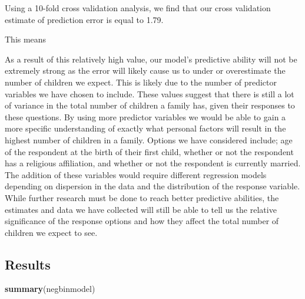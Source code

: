 \documentclass[
]{article}
\newenvironment{Shaded}{\begin{snugshade}}{\end{snugshade}}
\newcommand{\KeywordTok}[1]{\textcolor[rgb]{0.13,0.29,0.53}{\textbf{#1}}}
\newcommand{\NormalTok}[1]{#1}
\begin{document}
Using a 10-fold cross validation analysis, we find that our cross
validation estimate of prediction error is equal to 1.79.

This means

As a result of this relatively high value, our model's predictive
ability will not be extremely strong as the error will likely cause us
to under or overestimate the number of children we expect. This is
likely due to the number of predictor variables we have chosen to
include. These values suggest that there is still a lot of variance in
the total number of children a family has, given their responses to
these questions. By using more predictor variables we would be able to
gain a more specific understanding of exactly what personal factors will
result in the highest number of children in a family. Options we have
considered include; age of the respondent at the birth of their first
child, whether or not the respondent has a religious affiliation, and
whether or not the respondent is currently married. The addition of
these variables would require different regression models depending on
dispersion in the data and the distribution of the response variable.
While further research must be done to reach better predictive
abilities, the estimates and data we have collected will still be able
to tell us the relative significance of the response options and how
they affect the total number of children we expect to see.

\hypertarget{results}{%
\subsection{Results}\label{results}}

\begin{Shaded}
\begin{Highlighting}[]
\KeywordTok{summary}\NormalTok{(negbinmodel)}
\end{Highlighting}
\end{Shaded}
\end{document}
